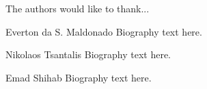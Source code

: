 \documentclass[10pt,journal,compsoc]{IEEEtran}
\begin{document}
The authors would like to thank...


\ifCLASSOPTIONcaptionsoff
  \newpage
\fi



 

% 

\begin{IEEEbiography}{Everton da S. Maldonado}
Biography text here.
\end{IEEEbiography}

\begin{IEEEbiography}{Nikolaos Tsantalis}
Biography text here.
\end{IEEEbiography}

\begin{IEEEbiography}{Emad Shihab}
Biography text here.
\end{IEEEbiography}




\appendices

\end{document}

